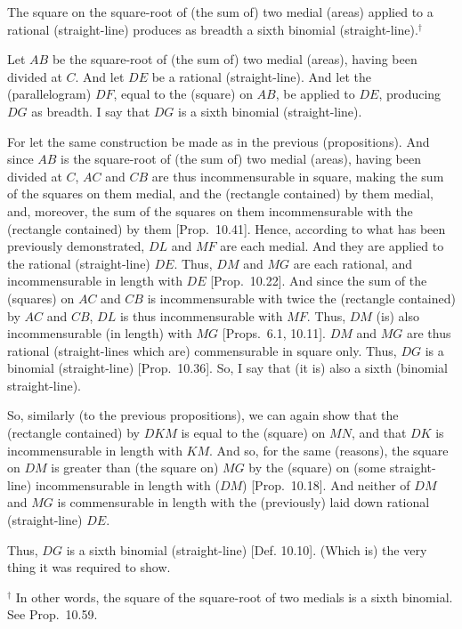\begin{Parallel}{}{}
{The square on the square-root of (the sum of) two medial
(areas) applied to a rational (straight-line) produces as breadth  a sixth binomial (straight-line).$^\dag$

Let $AB$ be the square-root of (the sum of) two medial (areas), having been divided
at $C$. And let $DE$ be a  rational (straight-line). And let the (parallelogram) $DF$, equal to the (square) on $AB$, be applied to $DE$, producing $DG$
as breadth. I say that $DG$ is a sixth binomial (straight-line).

\epsfysize=1.6in 
\centerline{}

For  let the same construction  be made  as in the previous (propositions). And since $AB$ is the square-root of (the sum of) two medial
(areas), having been divided at $C$, $AC$ and $CB$ are thus incommensurable
in square, making the sum of the squares on them medial, and the (rectangle
contained) by them medial, and, moreover, the sum of the squares on them
incommensurable with the (rectangle contained) by them [Prop.~10.41]. Hence, according to
what has been previously  demonstrated, $DL$ and $MF$ are each medial.
And they are applied to the rational (straight-line) $DE$. Thus, $DM$ and
$MG$ are each rational, and incommensurable in length with $DE$ [Prop.~10.22]. And since the sum of the (squares)
on $AC$ and $CB$ is incommensurable with twice the (rectangle contained)
by $AC$ and $CB$, $DL$ is thus incommensurable with $MF$. Thus,
$DM$ (is) also incommensurable (in length) with $MG$
[Props.~6.1, 10.11]. 
$DM$ and $MG$ are thus rational (straight-lines which are) commensurable
in square only. Thus, $DG$ is a binomial (straight-line) [Prop.~10.36]. So, I say that (it is) also a sixth
(binomial straight-line).

So, similarly (to the previous propositions), we can again show that the (rectangle contained) by $DKM$ is equal to the (square) on $MN$, and that
$DK$ is incommensurable in length with $KM$. And so, for the same (reasons), the square on $DM$ is greater than (the square on) $MG$ by the
(square) on (some straight-line) incommensurable in length with ($DM$) [Prop.~10.18]. And neither of $DM$ and $MG$
is commensurable in length with the (previously) laid down rational (straight-line) $DE$.

Thus, $DG$ is a sixth binomial (straight-line) [Def. 10.10]. (Which is) the very thing it
was required to show.}
\end{Parallel}
{\footnotesize\noindent $^\dag$ In other words, the square of the square-root of  two  medials  is a
sixth binomial. See Prop.~10.59.\\}

